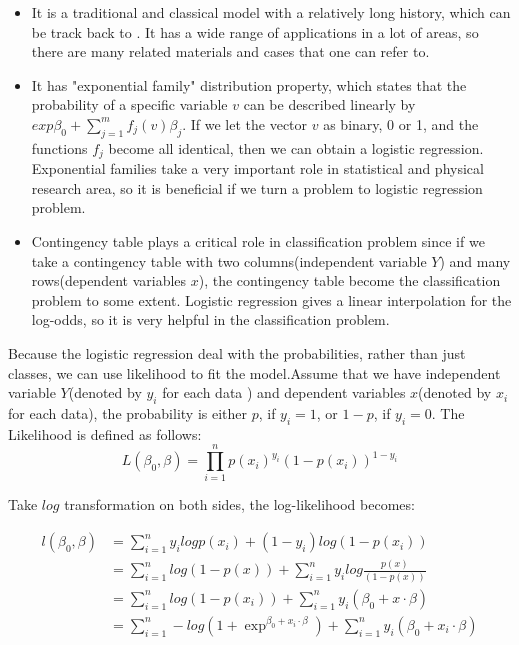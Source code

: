 \begin{itemize}
	\item It is a traditional and classical model with a relatively long history, which can be track back to \cite{bliss1934method}. It has a wide range of applications in a lot of areas, so there are many related materials and cases that one can refer to. 
	\item It has "exponential family" distribution property, which states that the probability of a specific variable $v$ can be described linearly by $exp\beta_0+\sum_{j=1}^{m}f_j(v)\beta_j$. If we let the vector $v$ as binary, 0 or 1, and the functions $f_j$ become all identical, then we can obtain a logistic regression. Exponential families take a very important role in statistical and physical research area, so it is beneficial if we turn a problem to logistic regression problem.  
	\item Contingency table plays a critical role in classification problem since if we take a contingency table with two columns(independent variable $Y$) and many rows(dependent variables $x$), the contingency table become the classification problem to some extent. Logistic regression gives a linear interpolation for the log-odds, so it is very helpful in the classification problem.  

\end{itemize}

Because the logistic regression deal with the probabilities, rather than just classes, we can use likelihood to fit the model.Assume that we have independent variable $Y$(denoted by $y_i$ for each data ) and dependent variables $x$(denoted by $x_i$ for each data), the probability is either $p$, if $y_i=1$, or $1-p$, if $y_i=0$. The Likelihood is defined as follows:
\begin{equation}\label{en:likelihood}
L(\beta_0,\beta)=\prod_{i=1}^{n}p(x_i)^{y_i}(1-p(x_i))^{1-y_i}
\end{equation}

Take $log$ transformation on both sides, the log-likelihood becomes:

\begin{equation}\label{en:log-likelihood}
\begin{aligned}
l(\beta_0,\beta)&=\sum_{i=1}^{n}y_i logp(x_i)+(1-y_i)log(1-p(x_i))\\
&=\sum_{i=1}^{n}log(1-p(x))+\sum_{i=1}^{n}y_ilog\frac{p(x)}{(1-p(x))}\\
&=\sum_{i=1}^{n}log(1-p(x_i))+\sum_{i=1}^{n}y_i(\beta_0+x\cdot \beta)\\
&=\sum_{i=1}^{n}-log(1+\exp^{\beta_0+x_i\cdot \beta})+ \sum_{i=1}^{n}y_i(\beta_0+x_i\cdot\beta)
\end{aligned}
\end{equation}

